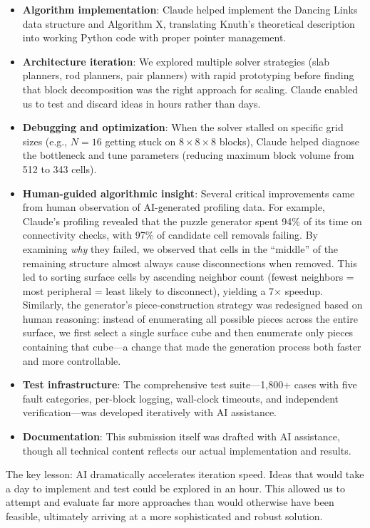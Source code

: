 \documentclass[11pt]{article}
\begin{document}
\begin{itemize}[nosep]
  \item \textbf{Algorithm implementation}: Claude helped implement the Dancing Links data structure and Algorithm X, translating Knuth's theoretical description into working Python code with proper pointer management.
  \item \textbf{Architecture iteration}: We explored multiple solver strategies (slab planners, rod planners, pair planners) with rapid prototyping before finding that block decomposition was the right approach for scaling. Claude enabled us to test and discard ideas in hours rather than days.
  \item \textbf{Debugging and optimization}: When the solver stalled on specific grid sizes (e.g., $N=16$ getting stuck on $8\times8\times8$ blocks), Claude helped diagnose the bottleneck and tune parameters (reducing maximum block volume from 512 to 343 cells).
  \item \textbf{Human-guided algorithmic insight}: Several critical improvements came from human observation of AI-generated profiling data. For example, Claude's profiling revealed that the puzzle generator spent 94\% of its time on connectivity checks, with 97\% of candidate cell removals failing. By examining \emph{why} they failed, we observed that cells in the ``middle'' of the remaining structure almost always cause disconnections when removed. This led to sorting surface cells by ascending neighbor count (fewest neighbors = most peripheral = least likely to disconnect), yielding a 7$\times$ speedup. Similarly, the generator's piece-construction strategy was redesigned based on human reasoning: instead of enumerating all possible pieces across the entire surface, we first select a single surface cube and then enumerate only pieces containing that cube---a change that made the generation process both faster and more controllable.
  \item \textbf{Test infrastructure}: The comprehensive test suite---1,800+ cases with five fault categories, per-block logging, wall-clock timeouts, and independent verification---was developed iteratively with AI assistance.
  \item \textbf{Documentation}: This submission itself was drafted with AI assistance, though all technical content reflects our actual implementation and results.
\end{itemize}

The key lesson: AI dramatically accelerates iteration speed. Ideas that would take a day to implement and test could be explored in an hour. This allowed us to attempt and evaluate far more approaches than would otherwise have been feasible, ultimately arriving at a more sophisticated and robust solution.
\end{document}
